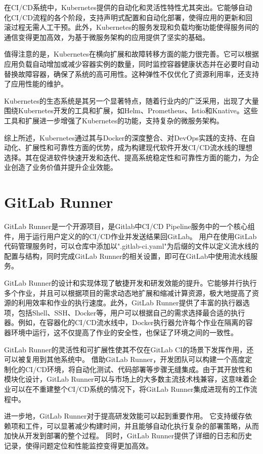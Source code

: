 在CI/CD系统中，Kubernetes提供的自动化和灵活性特性尤其突出\cite{janani2022analysis}。它能够自动化CI/CD流程的各个阶段，支持声明式配置和自动化部署，使得应用的更新和回滚过程无需人工干预。此外，Kubernetes的服务发现和负载均衡功能使得服务间的通信变得更加高效，为基于微服务架构的应用提供了坚实的基础。

值得注意的是，Kubernetes在横向扩展和故障转移方面的能力很完善\cite{JSSG201909023}。它可以根据应用负载自动增加或减少容器实例的数量，同时监控容器健康状态并在必要时自动替换故障容器，确保了系统的高可用性。这种弹性不仅优化了资源利用率，还支持了应用性能的维护。

Kubernetes的生态系统是其另一个显著特点，随着行业内的广泛采用，出现了大量围绕Kubernetes开发的工具和扩展，如Helm、Prometheus、Istio和Knative。这些工具和扩展进一步增强了Kubernetes的功能，支持复杂的微服务架构。

综上所述，Kubernetes通过其与Docker的深度整合、对DevOps实践的支持、在自动化、扩展性和可靠性方面的优势，成为构建现代软件开发CI/CD流水线的理想选择。其在促进软件快速开发和迭代、提高系统稳定性和可靠性方面的能力，为企业创造了业务价值并提升企业效能。


\section{GitLab Runner}
GitLab Runner是一个开源项目，是Gitlab中CI/CD Pipeline服务中的一个核心组件，用于运行用户定义的的CI/CD作业并发送结果回GitLab\cite{eguzo2023automating}。
用户在使用GitLab代码管理服务时，可以仓库中添加以".gitlab-ci.yaml"为后缀的文件以定义流水线的配置与结构，同时完成GitLab Runner的相关设置，即可在GitLab中使用流水线服务。

GitLab Runner的设计和实现体现了敏捷开发和研发效能的提升。它能够并行执行多个作业，并且可以根据项目的需求动态地扩展和缩减计算资源，极大地提高了资源的利用效率和作业的执行速度。此外，GitLab Runner提供了丰富的执行器选项，包括Shell、SSH、Docker等，用户可以根据自己的需求选择最合适的执行器。例如，在容器化的CI/CD流水线中，Docker执行器允许每个作业在隔离的容器环境中运行，这不仅提高了作业的安全性，也保证了环境之间的一致性。

GitLab Runner的灵活性和可扩展性使其不仅在GitLab CI的场景下发挥作用，还可以被复用到其他系统中。
借助GitLab Runner，开发团队可以构建一个高度定制化的CI/CD环境，将自动化测试、代码部署等步骤无缝集成。由于其开放性和模块化设计，GitLab Runner可以与市场上的大多数主流技术栈兼容，这意味着企业可以在不重建整个CI/CD系统的情况下，将GitLab Runner集成进现有的工作流程中。

进一步地，GitLab Runner对于提高研发效能可以起到重要作用。
它支持缓存依赖项和工件，可以显著减少构建时间，并且能够自动化执行复杂的部署策略，从而加快从开发到部署的整个过程。
同时，GitLab Runner提供了详细的日志和历史记录，使得问题定位和性能监控变得更加高效\cite{vassallo2020configuration}。

